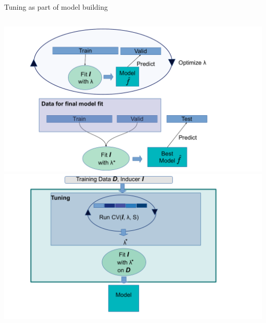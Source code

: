 \documentclass[11pt,compress,t,notes=noshow, xcolor=table]{beamer}
\begin{document}
\begin{vbframe}{Tuning as part of model building}
\vspace{1cm}
\begin{columns}[c, onlytextwidth]
\hspace*{-0.3cm}
\includegraphics[width=1.5\textwidth]{figure_man/train_valid_test.pdf}
\hspace*{-0.7cm}
\includegraphics[width=1.5\textwidth]{figure_man/autotune_in_model_fit.pdf}
\end{columns}
\end{vbframe}

\endlecture
\end{document}
